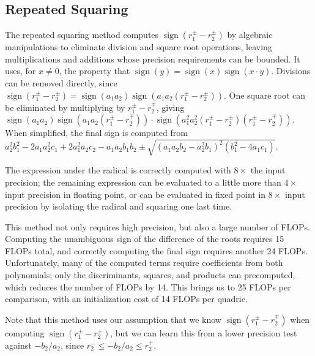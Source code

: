\documentclass{cccg16}
\DeclareMathOperator{\sign}{sign}
\begin{document}
\subsection{Repeated Squaring}
The repeated squaring method computes $\sign(r_1^\pm-r_2^\pm)$ by
algebraic manipulations to eliminate division and square root
operations, leaving multiplications and additions whose precision
requirements can be bounded.  It uses, for $x\ne 0$, the property that
$\sign(y)=\sign(x)\sign(x\cdot y)$.  Divisions can be removed
directly, since $\sign(r_1^\pm-r_2^\pm)=\sign(a_1 a_2)\sign(a_1 a_2
(r_1^\pm-r_2^\pm))$.  One square root can be eliminated by multiplying
by $r_1^\pm-r_2^\mp$, giving~$\sign(a_1 a_2)\sign(a_1 a_2
(r_1^\pm-r_2^\mp))\cdot\sign(a_1^2 a_2^2 (r_1^\pm - r_2^\pm) (r_1^\pm
- r_2^\mp))$.  When simplified, the final sign is computed
from~$a_2^2b_1^2-2a_1a_2^2c_1+2a_1^2a_2c_2-a_1a_2b_1b_2\pm
\sqrt{(a_1a_2b_2-a_2^2b_1)^2(b_1^2-4a_1c_1)}$.

The expression under the radical is correctly computed with $8\times$
the input precision; the remaining expression can be evaluated to a
little more than $4\times$ input precision in floating point, or can
be evaluated in fixed point in $8\times$ input precision by isolating
the radical and squaring one last time.

This method not only requires high precision, but also a large number
of FLOPs.  Computing the unambiguous sign of the difference of the
roots requires 15 FLOPs total, and correctly computing the final sign
requires another 24 FLOPs.  Unfortunately, many of the computed terms
require coefficients from both polynomials; only the discriminants,
squares, and products can precomputed, which reduces the number of
FLOPs by 14.  This brings us to 25 FLOPs per comparison, with an
initialization cost of 14 FLOPs per quadric.

Note that this method uses our assumption that we know
$\sign(r_1^\pm-r_2^\mp)$ when computing $\sign(r_1^\pm-r_2^\pm)$, but
we can learn this from a lower precision test against $-b_2/a_2$,
since $r_2^- \le -b_2/a_2 \le r_2^+$.
\end{document}
